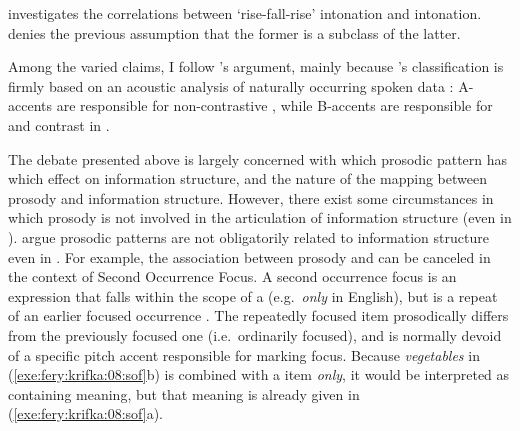 

\noindent \citeauthor{constant:12} investigates the correlations
between `rise-fall-rise' intonation and  intonation.
\citeauthor{constant:12} denies the previous assumption that the
former is a subclass of the latter.



Among the varied claims, I follow \citet{hedberg:06}'s argument,
mainly because \citeauthor{hedberg:06}'s classification is firmly
based on an acoustic analysis of naturally occurring spoken data
\citep{hedberg:sosa:07}: A-accents are responsible for non-contrastive
, while B-accents are responsible for  and contrast in
. 




The debate presented above is largely concerned with which prosodic
pattern has which effect on information structure, and the nature of
the mapping between prosody and information structure. However, there
exist some circumstances in which prosody is not involved in the
articulation of information structure (even in ).
\citet{fery:krifka:08} argue prosodic patterns are not obligatorily
related to information structure even in .
For example, the association between prosody and  can be canceled
in the context of Second Occurrence Focus.  A second occurrence focus
is an expression that falls within the scope of a  (e.g.\ \textit{only} in English), but is a repeat of an
earlier focused occurrence \citep{partee:99,beaver:etal:07,
  fery:ishihara:09}. The repeatedly focused item prosodically differs
from the previously focused one (i.e.\ ordinarily focused), and is
normally devoid of a specific pitch accent responsible for marking
focus.  Because \textit{vegetables} in (\ref{exe:fery:krifka:08:sof}b)
is combined with a  item \textit{only}, it would
be interpreted as containing  meaning, but that meaning is
already given in (\ref{exe:fery:krifka:08:sof}a).




